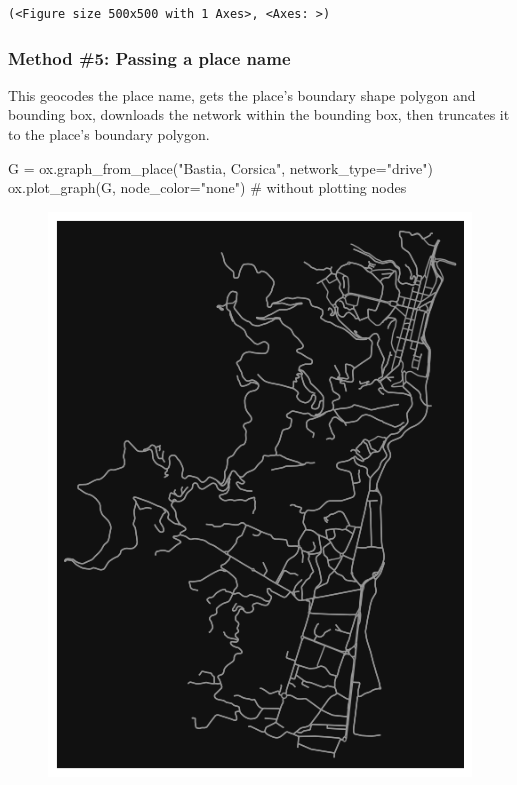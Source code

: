 \documentclass[
  letterpaper,
  DIV=11,
  numbers=noendperiod]{scrreprt}
\newenvironment{Shaded}{\begin{snugshade}}{\end{snugshade}}
\newcommand{\CommentTok}[1]{\textcolor[rgb]{0.37,0.37,0.37}{#1}}
\newcommand{\NormalTok}[1]{\textcolor[rgb]{0.00,0.23,0.31}{#1}}
\newcommand{\OperatorTok}[1]{\textcolor[rgb]{0.37,0.37,0.37}{#1}}
\newcommand{\StringTok}[1]{\textcolor[rgb]{0.13,0.47,0.30}{#1}}
\begin{document}
\begin{verbatim}
(<Figure size 500x500 with 1 Axes>, <Axes: >)
\end{verbatim}

\hypertarget{method-5-passing-a-place-name}{%
\subsubsection{Method \#5: Passing a place
name}\label{method-5-passing-a-place-name}}

This geocodes the place name, gets the place's boundary shape polygon
and bounding box, downloads the network within the bounding box, then
truncates it to the place's boundary polygon.

\begin{Shaded}
\begin{Highlighting}[]
\NormalTok{G }\OperatorTok{=}\NormalTok{ ox.graph\_from\_place(}\StringTok{"Bastia, Corsica"}\NormalTok{, network\_type}\OperatorTok{=}\StringTok{"drive"}\NormalTok{)}
\NormalTok{ox.plot\_graph(G, node\_color}\OperatorTok{=}\StringTok{"none"}\NormalTok{) }\CommentTok{\# without plotting nodes}
\end{Highlighting}
\end{Shaded}

\begin{figure}[H]

{\centering \includegraphics{labs/w07_OSM_files/figure-pdf/cell-11-output-1.png}

}

\end{figure}
\end{document}
